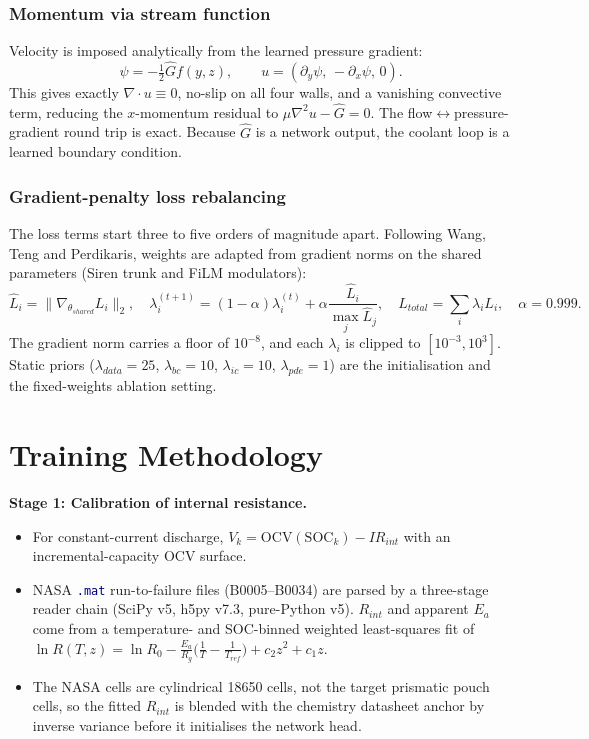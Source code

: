 \documentclass[10.5pt,a4paper]{article}
\newcommand{\code}[1]{\texttt{\textcolor{navy}{#1}}}
\begin{document}
\subsubsection*{Momentum via stream function}
Velocity is imposed analytically from the learned pressure gradient:
\begin{equation}
  \psi=-\tfrac12\hat G f(y,z),\qquad u=(\partial_y\psi,\,-\partial_x\psi,\,0).
\end{equation}
This gives exactly $\nabla\!\cdot u\equiv0$, no-slip on all four walls, and a vanishing convective term, reducing the $x$-momentum residual to $\mu\nabla^2u-\hat G=0$. The flow$\leftrightarrow$pressure-gradient round trip is exact. Because $\hat G$ is a network output, the coolant loop is a learned boundary condition.

\subsubsection*{Gradient-penalty loss rebalancing}
The loss terms start three to five orders of magnitude apart. Following Wang, Teng and Perdikaris, weights are adapted from gradient norms on the shared parameters (Siren trunk and FiLM modulators):
\begin{equation}
  \hat L_i=\big\|\nabla_{\theta_{shared}}L_i\big\|_2,\quad
  \lambda_i^{(t+1)}=(1-\alpha)\lambda_i^{(t)}+\alpha\frac{\hat L_i}{\max_j\hat L_j},\quad
  L_{total}=\sum_i\lambda_i L_i,\quad \alpha=0.999 .
\end{equation}
The gradient norm carries a floor of $10^{-8}$, and each $\lambda_i$ is clipped to $[10^{-3},10^{3}]$. Static priors ($\lambda_{data}=25$, $\lambda_{bc}=10$, $\lambda_{ic}=10$, $\lambda_{pde}=1$) are the initialisation and the fixed-weights ablation setting.

\section*{Training Methodology}
\textbf{Stage 1: Calibration of internal resistance.}
\begin{itemize}
  \item For constant-current discharge, $V_k=\mathrm{OCV}(\mathrm{SOC}_k)-IR_{int}$ with an incremental-capacity OCV surface.
  \item NASA \code{.mat} run-to-failure files (B0005--B0034) are parsed by a three-stage reader chain (SciPy v5, h5py v7.3, pure-Python v5). $R_{int}$ and apparent $E_a$ come from a temperature- and SOC-binned weighted least-squares fit of $\ln R(T,z)=\ln R_0-\frac{E_a}{R_g}\big(\frac1T-\frac1{T_{ref}}\big)+c_2z^2+c_1z$.
  \item The NASA cells are cylindrical 18650 cells, not the target prismatic pouch cells, so the fitted $R_{int}$ is blended with the chemistry datasheet anchor by inverse variance before it initialises the network head.
\end{itemize}
\end{document}
